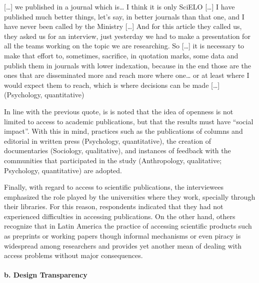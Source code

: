 \documentclass[
  letterpaper,
  DIV=11,
  numbers=noendperiod]{scrartcl}
\let\oldparagraph\paragraph
\renewcommand{\paragraph}[1]{\oldparagraph{#1}\mbox{}}
\begin{document}
\begin{tcolorbox}[enhanced jigsaw, leftrule=.75mm, opacityback=0, breakable, rightrule=.15mm, left=2mm, colback=white, arc=.35mm, bottomrule=.15mm, toprule=.15mm]

{[}\ldots{]} we published in a journal which is\ldots{} I think it is
only SciELO {[}\ldots{]} I have published much better things, let's say,
in better journals than that one, and I have never been called by the
Ministry {[}\ldots{]} And for this article they called us, they asked us
for an interview, just yesterday we had to make a presentation for all
the teams working on the topic we are researching. So {[}\ldots{]} it is
necessary to make that effort to, sometimes, sacrifice, in quotation
marks, some data and publish them in journals with lower indexation,
because in the end those are the ones that are disseminated more and
reach more where one\ldots{} or at least where I would expect them to
reach, which is where decisions can be made {[}\ldots{]} (Psychology,
quantitative)

\end{tcolorbox}

In line with the previous quote, is is noted that the idea of openness
is not limited to access to academic publications, but that the results
must have ``social impact''. With this in mind, practices such as the
publications of columns and editorial in written press (Psychology,
quantitative), the creation of documentaries (Sociology, qualitative),
and instances of feedback with the communities that participated in the
study (Anthropology, qualitative; Psychology, quantitative) are adopted.

Finally, with regard to access to scientific publications, the
interviewees emphasized the role played by the universities where they
work, specially through their libraries. For this reason, respondents
indicated that they had not experienced difficulties in accessing
publications. On the other hand, others recognize that in Latin America
the practice of accessing scientific products such as preprints or
working papers though informal mechanisms or even piracy is widespread
among researchers and provides yet another mean of dealing with access
problems without major consequences.

\hypertarget{b.-design-transparency}{%
\paragraph{b. Design Transparency}\label{b.-design-transparency}}
\end{document}
